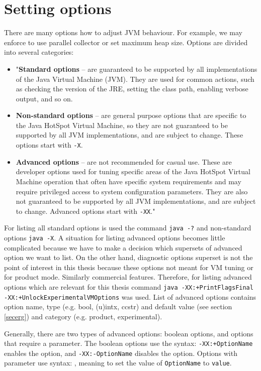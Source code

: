 \documentclass[
  digital, %
  oneside,
  notable, %
  nolof,     %
  nolot     %
]{fithesis3}
\begin{document}
\section{Setting options}\label{secoptions}
There are many options how to adjust JVM behaviour. For example, we may enforce to use parallel collector or set maximum heap size. Options are divided into several categories:
\begin{itemize}
	\item "\textbf{Standard options} -- are guaranteed to be supported by all implementations of the Java Virtual Machine (JVM). They are used for common actions, such as checking the version of the JRE, setting the class path, enabling verbose output, and so on.
	\item \textbf{Non-standard options} -- are general purpose options that are specific to the Java HotSpot Virtual Machine, so they are not guaranteed to be supported by all JVM implementations, and are subject to change. These options start with \texttt{-X}.
	\item \textbf{Advanced options} -- are not recommended for casual use. These are developer options used for tuning specific areas of the Java HotSpot Virtual Machine operation that often have specific system requirements and may require privileged access to system configuration parameters. They are also not guaranteed to be supported by all JVM implementations, and are subject to change. Advanced options start with \texttt{-XX}." \cite{java}
\end{itemize}
For listing all standard options is used the command \texttt{java -?} and non-standard options \texttt{java -X}. A situation for listing advanced options becomes little complicated because we have to make a decision which supersets of advanced option we want to list. On the other hand, diagnostic options superset is not the point of interest in this thesis because these options not meant for VM tuning or for product mode. Similarly commercial features. Therefore, for listing advanced options which are relevant for this thesis command \texttt{java -XX:+PrintFlagsFinal -XX:+UnlockExperimentalVMOptions} was used. List of advanced options contains option name, type (e.g. bool, (u)intx, ccstr) and default value (see section \ref{secerg}) and category (e.g. product, experimental).

Generally, there are two types of advanced options: boolean options, and options that require a parameter. The boolean options use the syntax: \texttt{-XX:+OptionName} enables the option, and \texttt{-XX:-OptionName} disables the option. Options with parameter use syntax: \texttt{}, meaning to set the value of \texttt{OptionName} to \texttt{value}. \cite{scott}
\end{document}
